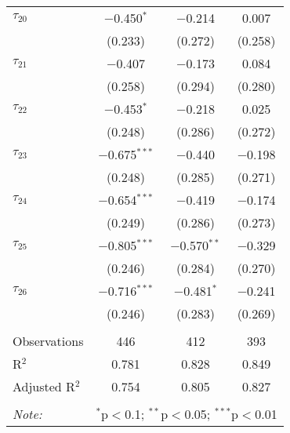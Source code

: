 \begin{tabular}{@{\extracolsep{5pt}}lccc}
 $\tau_{20}$ & $-$0.450$^{*}$ & $-$0.214 & 0.007 \\ 
  & (0.233) & (0.272) & (0.258) \\ 
   
 $\tau_{21}$ & $-$0.407 & $-$0.173 & 0.084 \\ 
  & (0.258) & (0.294) & (0.280) \\ 
   
 $\tau_{22}$ & $-$0.453$^{*}$ & $-$0.218 & 0.025 \\ 
  & (0.248) & (0.286) & (0.272) \\ 
   
 $\tau_{23}$ & $-$0.675$^{***}$ & $-$0.440 & $-$0.198 \\ 
  & (0.248) & (0.285) & (0.271) \\ 
   
 $\tau_{24}$ & $-$0.654$^{***}$ & $-$0.419 & $-$0.174 \\ 
  & (0.249) & (0.286) & (0.273) \\ 
   
 $\tau_{25}$ & $-$0.805$^{***}$ & $-$0.570$^{**}$ & $-$0.329 \\ 
  & (0.246) & (0.284) & (0.270) \\ 
   
 $\tau_{26}$ & $-$0.716$^{***}$ & $-$0.481$^{*}$ & $-$0.241 \\ 
  & (0.246) & (0.283) & (0.269) \\ 
   
\hline \\[-1.8ex] 
Observations & 446 & 412 & 393 \\ 
R$^{2}$ & 0.781 & 0.828 & 0.849 \\ 
Adjusted R$^{2}$ & 0.754 & 0.805 & 0.827 \\ 
\hline 
\hline \\[-1.8ex] 
\textit{Note:}  & \multicolumn{3}{r}{$^{*}$p$<$0.1; $^{**}$p$<$0.05; $^{***}$p$<$0.01} \\ 
\end{tabular} 